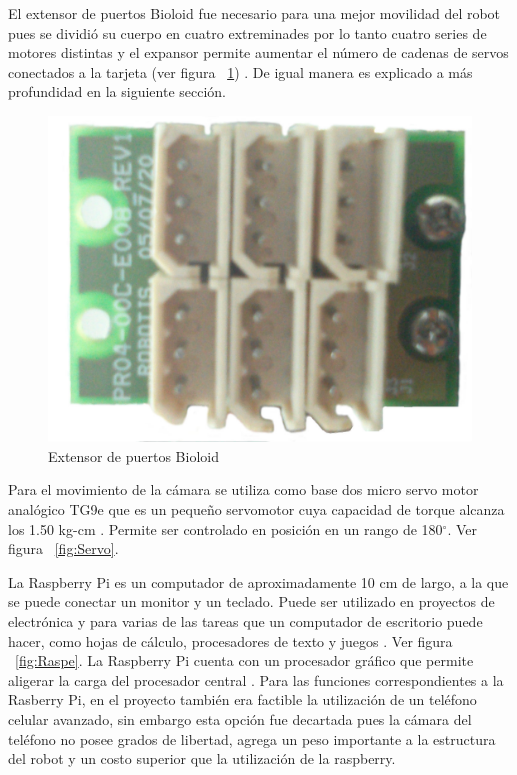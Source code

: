 El extensor de puertos Bioloid fue necesario para una mejor movilidad del robot pues se dividi\'o su cuerpo en cuatro extreminades por lo tanto cuatro series de motores distintas y el expansor permite aumentar el número de cadenas de servos conectados a la tarjeta (ver figura ~\ref{fig:ext}) \cite{hub}.
De igual manera es explicado a m\'as profundidad en la siguiente secci\'on.


\begin{figure}[hbtp]
\centering
\includegraphics[scale=0.08]{imagenes/extensor.jpg}
\caption{Extensor de puertos Bioloid}
\label{fig:ext}
\end{figure}
 
Para el movimiento de la c\'amara se utiliza como base dos micro servo motor anal\'ogico TG9e que es un pequeño servomotor cuya capacidad de torque alcanza los 1.50 kg-cm \cite{microservo}. Permite ser controlado en posición en un rango de 180$^{\circ}$. Ver figura ~\ref{fig:Servo}.   

La Raspberry Pi es un computador de aproximadamente 10 cm de largo, a la que se puede conectar un monitor y un teclado. Puede ser utilizado en proyectos de electrónica y para varias de las tareas que un computador de escritorio puede hacer, como hojas de cálculo, procesadores de texto y juegos \cite{raspberry}. Ver figura ~\ref{fig:Raspe}. La Raspberry Pi cuenta con un procesador gráfico que permite aligerar la carga del procesador central \cite{elLinux}. Para las funciones correspondientes a la Rasberry Pi, en el proyecto tambi\'en era factible la utilizaci\'on de un tel\'efono celular avanzado, sin embargo esta opci\'on fue decartada pues la c\'amara del tel\'efono no posee grados de libertad, agrega un peso importante a la estructura del robot y un costo superior que la utilizaci\'on de la raspberry.  



